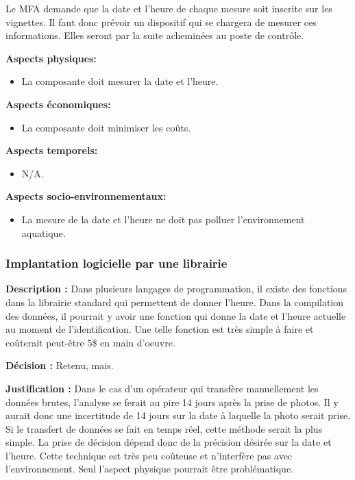 Le MFA demande que la date et l'heure de chaque mesure soit inscrite sur les vignettes. Il faut donc prévoir un dispositif qui se chargera de mesurer ces informations. Elles seront par la suite acheminées au poste de contrôle. 

\textbf{Aspects physiques:}
\begin{itemize}[label = {--}]
    \item La composante doit mesurer la date et l'heure.
\end{itemize}

\textbf{Aspects économiques:}
\begin{itemize}[label = {--}]
    \item La composante doit minimiser les coûts.
\end{itemize}

\textbf{Aspects temporels:}
\begin{itemize}[label = {--}]
    \item N/A.
\end{itemize}

\textbf{Aspects socio-environnementaux:}
\begin{itemize}[label = {--}]
    \item La mesure de la date et l'heure ne doit pas polluer l'environnement aquatique.
\end{itemize}

\subsubsection{Implantation logicielle par une librairie}

\textbf{Description :} Dans plusieurs langages de programmation, il existe des fonctions dans la librairie standard qui permettent de donner l'heure. Dans la compilation des données, il pourrait y avoir une fonction qui donne la date et l'heure actuelle au moment de l'identification. Une telle fonction est très simple à faire et coûterait peut-être 5\$ en main d'oeuvre.

\textbf{Décision :} Retenu, mais.

\textbf{Justification :} Dans le cas d'un opérateur qui transfère manuellement les données brutes, l'analyse se ferait au pire 14 jours après la prise de photos. Il y aurait donc une incertitude de 14 jours sur la date à laquelle la photo serait prise. Si le transfert de données se fait en temps réel, cette méthode serait la plus simple. La prise de décision dépend donc de la précision désirée sur la date et l'heure. Cette technique est très peu coûteuse et n'interfère pas avec l'environnement. Seul l'aspect physique pourrait être problématique.

